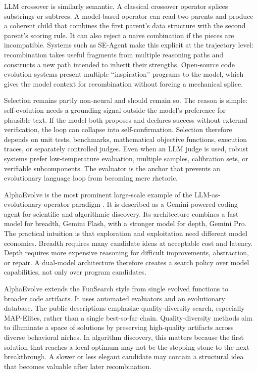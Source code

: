 LLM crossover is similarly semantic.  A classical crossover operator splices substrings or subtrees.  A model-based operator can read two parents and produce a coherent child that combines the first parent's data structure with the second parent's scoring rule.  It can also reject a naive combination if the pieces are incompatible.  Systems such as SE-Agent make this explicit at the trajectory level: recombination takes useful fragments from multiple reasoning paths and constructs a new path intended to inherit their strengths.  Open-source code evolution systems present multiple ``inspiration'' programs to the model, which gives the model context for recombination without forcing a mechanical splice.

Selection remains partly non-neural and should remain so.  The reason is simple: self-evolution needs a grounding signal outside the model's preference for plausible text.  If the model both proposes and declares success without external verification, the loop can collapse into self-confirmation.  Selection therefore depends on unit tests, benchmarks, mathematical objective functions, execution traces, or separately controlled judges.  Even when an LLM judge is used, robust systems prefer low-temperature evaluation, multiple samples, calibration sets, or verifiable subcomponents.  The evaluator is the anchor that prevents an evolutionary language loop from becoming mere rhetoric.

AlphaEvolve is the most prominent large-scale example of the LLM-as-evolutionary-operator paradigm \cite{alphaevolve2025}.  It is described as a Gemini-powered coding agent for scientific and algorithmic discovery.  Its architecture combines a fast model for breadth, Gemini Flash, with a stronger model for depth, Gemini Pro.  The practical intuition is that exploration and exploitation need different model economics.  Breadth requires many candidate ideas at acceptable cost and latency.  Depth requires more expensive reasoning for difficult improvements, abstraction, or repair.  A dual-model architecture therefore creates a search policy over model capabilities, not only over program candidates.

AlphaEvolve extends the FunSearch style from single evolved functions to broader code artifacts.  It uses automated evaluators and an evolutionary database.  The public descriptions emphasize quality-diversity search, especially MAP-Elites, rather than a single best-so-far chain.  Quality-diversity methods aim to illuminate a space of solutions by preserving high-quality artifacts across diverse behavioral niches.  In algorithm discovery, this matters because the first solution that reaches a local optimum may not be the stepping stone to the next breakthrough.  A slower or less elegant candidate may contain a structural idea that becomes valuable after later recombination.

